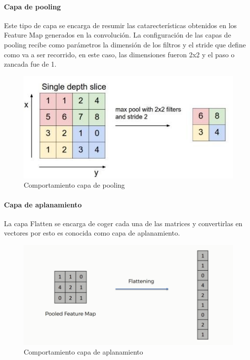 \documentclass{article}
\begin{document}
\paragraph{Capa de pooling} 
Este tipo de capa se encarga de resumir las catarecter\'isticas
obtenidos en los Feature Map generados en la convoluci\'on. 
La configuraci\'on de las capas de pooling recibe como par\'ametros la dimensi\'on de los filtros 
y el stride que define como va a ser recorrido, en este caso, las dimensiones fueron 2x2 y el paso o zancada fue de 1. 
\begin{figure}[H]
  \caption{Comportamiento capa de pooling}
  \centering
  \includegraphics[scale=.80]{pooling}
\end{figure}
\paragraph{Capa de aplanamiento} La capa Flatten se encarga de coger cada una de las matrices y convertirlas en vectores por esto es conocida como capa de aplanamiento.
\begin{figure}[H]
  \caption{Comportamiento capa de aplanamiento}
  \centering
  \includegraphics[scale=.80]{flatten}
\end{figure}
\end{document}
